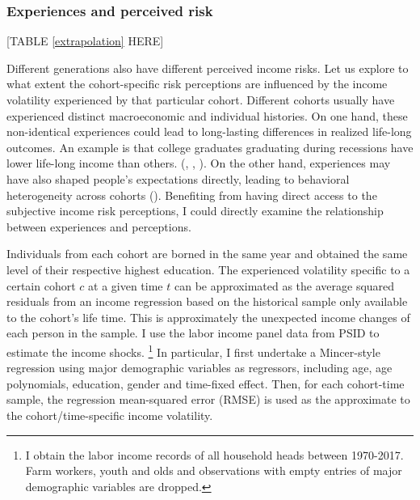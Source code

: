 \hypertarget{experiences-and-perceived-risk}{%
\subsubsection{Experiences and perceived
risk}\label{experiences-and-perceived-risk}}




\begin{center}
[TABLE \ref{extrapolation} HERE]
\end{center}




Different generations also have different perceived income risks. Let us
explore to what extent the cohort-specific risk perceptions are
influenced by the income volatility experienced by that particular
cohort. Different cohorts usually have experienced distinct
macroeconomic and individual histories. On one hand, these non-identical
experiences could lead to long-lasting differences in realized life-long
outcomes. An example is that college graduates graduating during
recessions have lower life-long income than others.
(\cite{kahn2010long}, \cite{oreopoulos2012short},
\cite{schwandt2019unlucky}). On the other hand, experiences may have
also shaped people's expectations directly, leading to behavioral
heterogeneity across cohorts (\cite{malmendier2015learning}). Benefiting
from having direct access to the subjective income risk perceptions, I
could directly examine the relationship between experiences and
perceptions.

Individuals from each cohort are borned in the same year and obtained
the same level of their respective highest education. The experienced
volatility specific to a certain cohort \(c\) at a given time \(t\) can
be approximated as the average squared residuals from an income
regression based on the historical sample only available to the cohort's
life time. This is approximately the unexpected income changes of each
person in the sample. I use the labor income panel data from PSID to
estimate the income shocks.
\footnote{I obtain the labor income records of all household heads between 1970-2017. Farm workers, youth and olds and observations with empty entries of major demographic variables are dropped. }
In particular, I first undertake a Mincer-style regression using major
demographic variables as regressors, including age, age polynomials,
education, gender and time-fixed effect. Then, for each cohort-time
sample, the regression mean-squared error (RMSE) is used as the
approximate to the cohort/time-specific income volatility.

